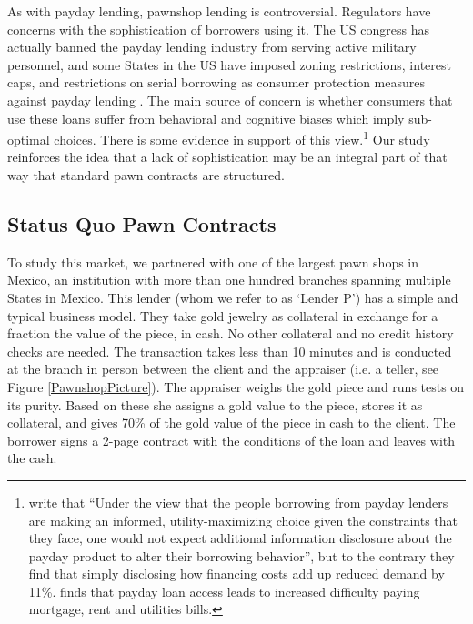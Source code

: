 \documentclass[oneside,11pt]{article}
\begin{document}


As with payday lending, pawnshop lending is controversial. Regulators have concerns with the sophistication of borrowers using it. The US congress has actually banned the payday lending industry from serving active military personnel, and some States in the US have imposed zoning restrictions, interest caps, and restrictions on serial borrowing as consumer protection measures against payday lending \citep{Payday}. The main source of concern is whether consumers that use these loans suffer from behavioral and cognitive biases which imply sub-optimal choices. There is some evidence  in support of this view.\footnote{\cite{Bertrand} write that ``Under the view that the people borrowing from payday lenders are making an informed, utility-maximizing choice given the constraints that they face, one  would not expect additional information disclosure about the payday product to  alter their borrowing behavior'', but to the contrary they find that simply disclosing how financing costs add up reduced demand by 11\%. \cite{Meltzer} finds that payday loan access leads to increased difficulty paying mortgage, rent and utilities bills.}   Our study reinforces the idea that a lack of sophistication may be an integral part of that way that standard pawn contracts are structured.



\subsection{Status Quo Pawn Contracts}

To study this market, we partnered with one of the largest pawn shops in Mexico, an institution with more than one hundred branches spanning multiple States in Mexico. This lender (whom we refer to as `Lender P') has a simple and typical business model. They take gold jewelry as collateral in exchange for a fraction the value of the piece, in cash. No other collateral and no credit history checks are needed. The transaction takes less than 10 minutes and is conducted at the branch in person between the client and the appraiser (i.e. a teller, see Figure \ref{PawnshopPicture}). The appraiser weighs the gold piece and runs tests on its purity. Based on these she assigns a gold value to the piece, stores it as collateral, and gives 70\% of the gold value of the piece in cash to the client. The borrower signs a 2-page contract with the conditions of the loan and leaves with the cash.
\end{document}

